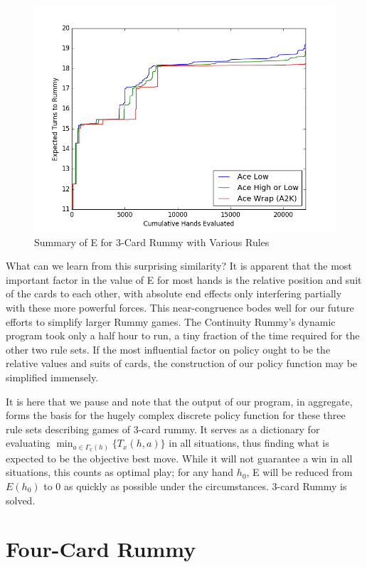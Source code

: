 \documentclass[letter,12pt]{article}
\begin{document}
\begin{figure}
\includegraphics[width=\textwidth]{fig2.png}
\caption{Summary of E for 3-Card Rummy with Various Rules}\label{fig:2}
\end{figure}

What can we learn from this surprising similarity? It is apparent that the most important factor in the value of E for most hands is the relative position and suit of the cards to each other, with absolute end effects only interfering partially with these more powerful forces.  This near-congruence bodes well for our future efforts to simplify larger Rummy games. The Continuity Rummy’s dynamic program took only a half hour to run, a tiny fraction of the time required for the other two rule sets. If the most influential factor on policy ought to be the relative values and suits of cards, the construction of our policy function may be simplified immensely.

It is here that we pause and note that the output of our program, in aggregate, forms the basis for the hugely complex discrete policy function for these three rule sets describing games of 3-card rummy. It serves as a dictionary for evaluating $\min_{a\in \Gamma_x(h)}\{T_x(h,a)\}$ in all situations, thus finding what is expected to be the objective best move. While it will not guarantee a win in all situations, this counts as optimal play; for any hand $h_0$, E will be reduced from $E(h_0)$ to 0 as quickly as possible under the circumstances. 3-card Rummy is solved. 

\section{Four-Card Rummy}
\end{document}
